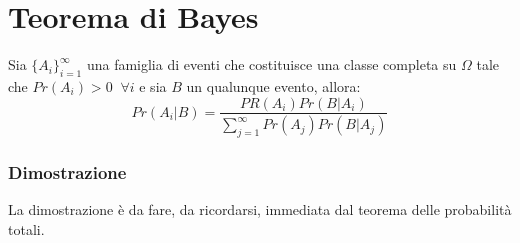 \section{Teorema di Bayes}
Sia $\{A_i\}_{i=1}^\infty$ una famiglia di eventi che costituisce una classe completa su $\Omega$ tale che $Pr(A_i)>0\;\;\forall i$ e sia $B$ un qualunque evento, 
allora:
\begin{equation}
Pr(A_i|B)=\dfrac{PR(A_i)Pr(B|A_i)}{\sum\limits_{j=1}^\infty Pr(A_j)Pr(B|A_j)}
\end{equation}
\subsubsection{Dimostrazione}
La dimostrazione \`e da fare, da ricordarsi, immediata dal teorema delle probabilit\`a totali.
